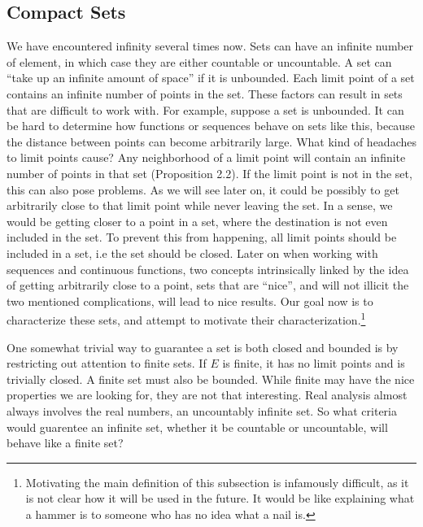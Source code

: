 \documentclass{article}
\theoremstyle{definition}
\begin{document}
\subsection{Compact Sets}
We have encountered infinity several times now. Sets can have an infinite number of element, in which case they are either countable or uncountable. A set can ``take up an infinite amount of space'' if it is unbounded. Each limit point of a set contains an infinite number of points in the set. These factors can result in sets that are difficult to work with. For example, suppose a set is unbounded. It can be hard to determine how functions or sequences behave on sets like this, because the distance between points can become arbitrarily large. What kind of headaches to limit points cause? Any neighborhood of a limit point will contain an infinite number of points in that set (Proposition 2.2). If the limit point is not in the set, this can also pose problems. As we will see later on, it could be possibly to get arbitrarily close to that limit point while never leaving the set. In a sense, we would be getting closer to a point in a set, where the destination is not even included in the set. To prevent this from happening, all limit points should be included in a set, i.e the set should be closed. Later on when working with sequences and continuous functions, two concepts intrinsically linked by the idea of getting arbitrarily close to a point, sets that are ``nice'', and will not illicit the two mentioned complications, will lead to nice results. Our goal now is to characterize these sets, and attempt to motivate their characterization.\footnote{Motivating the main definition of this subsection is infamously difficult, as it is not clear how it will be used in the future. It would be like explaining what a hammer is to someone who has no idea what a nail is. }   

One somewhat trivial way to guarantee a set is both closed and bounded is by restricting out attention to finite sets. If $ E $ is finite, it has no limit points and is trivially closed. A finite set must also be bounded. While finite may have the nice properties we are looking for, they are not that interesting. Real analysis almost always involves the real numbers, an uncountably infinite set. So what criteria would guarentee an infinite set, whether it be countable or uncountable, will behave like a finite set?
\end{document}
